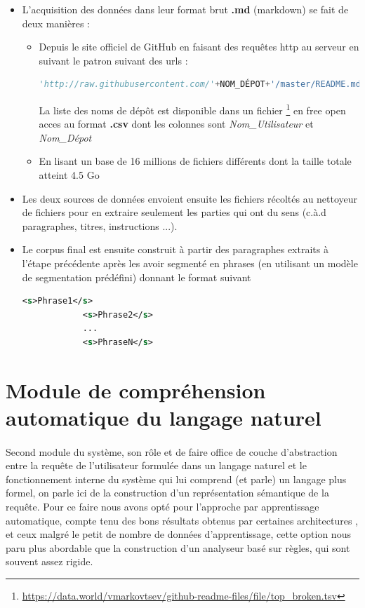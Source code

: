 		\begin{itemize}
			\item L'acquisition des données dans leur format brut \textbf{.md} (markdown) se fait de deux manières :
			\begin{itemize}
				\item Depuis le site officiel de GitHub en faisant des requêtes http au serveur en suivant le patron suivant des urls : 
				\begin{lstlisting}[language=python]
				'http://raw.githubusercontent.com/'+NOM_DÉPOT+'/master/README.md'\end{lstlisting}
				La liste des noms de dépôt est disponible dans un fichier \footnote{\url{https://data.world/vmarkovtsev/github-readme-files/file/top_broken.tsv}} en free open acces au format \textbf{.csv} dont les colonnes sont \textit{Nom\_Utilisateur} et \textit{Nom\_Dépot} 
				\item En lisant un base de 16 millions de fichiers différents dont la taille totale atteint 4.5 Go  
			\end{itemize}
			\item Les deux sources de données envoient ensuite les fichiers récoltés au nettoyeur de fichiers pour en extraire seulement les parties qui ont du sens (c.à.d paragraphes, titres, instructions ...).
			\item Le corpus final est ensuite construit à partir des paragraphes extraits à l'étape précédente après les avoir segmenté en phrases (en utilisant un modèle de segmentation prédéfini) donnant le format suivant \begin{lstlisting}[language=xml]
			<s>Phrase1</s>
			<s>Phrase2</s>
			...
			<s>PhraseN</s>\end{lstlisting}
		\end{itemize}
		

\section{Module de compréhension automatique du langage naturel}
\paragraph{}
Second module du système, son rôle et de faire office de couche d'abstraction entre la requête de l'utilisateur formulée dans un langage naturel et le fonctionnement interne du système qui lui comprend (et parle) un langage plus formel, on parle ici de la construction d'un représentation sémantique de la requête. Pour ce faire nous avons opté pour l'approche par apprentissage automatique, compte tenu des bons résultats obtenus par certaines architectures \cite{intent_slots},\cite{intent_classification} et ceux malgré le petit de nombre de données d'apprentissage, cette option nous paru plus abordable que la construction d'un analyseur basé sur règles, qui sont souvent assez rigide.
